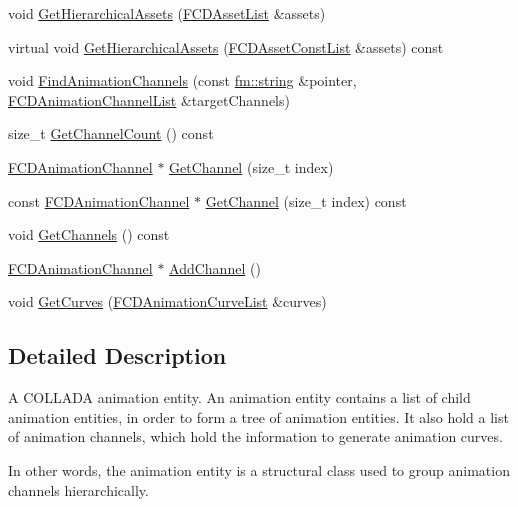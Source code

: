 \begin{DoxyCompactItemize}
\item 
void \hyperlink{classFCDAnimation_ab1598e18c09d09536a7e1b173c379927}{GetHierarchicalAssets} (\hyperlink{classfm_1_1pvector}{FCDAssetList} \&assets)
\item 
virtual void \hyperlink{classFCDAnimation_add68466cc91957fc0b0fe0961cb3948e}{GetHierarchicalAssets} (\hyperlink{classfm_1_1pvector}{FCDAssetConstList} \&assets) const 
\item 
void \hyperlink{classFCDAnimation_ae86237e164a1d535dc6f6a93412fd9d9}{FindAnimationChannels} (const \hyperlink{classfm_1_1stringT}{fm::string} \&pointer, \hyperlink{classfm_1_1pvector}{FCDAnimationChannelList} \&targetChannels)
\item 
size\_\-t \hyperlink{classFCDAnimation_ace899d6bc499d07fb65bcdd2c5a7fd3c}{GetChannelCount} () const 
\item 
\hyperlink{classFCDAnimationChannel}{FCDAnimationChannel} $\ast$ \hyperlink{classFCDAnimation_a09826937c16c3c73bdc9995aa751279c}{GetChannel} (size\_\-t index)
\item 
const \hyperlink{classFCDAnimationChannel}{FCDAnimationChannel} $\ast$ \hyperlink{classFCDAnimation_ac406240a1265a474bef985478d925286}{GetChannel} (size\_\-t index) const 
\item 
void \hyperlink{classFCDAnimation_a0fd3e11834d0ceb9fdd13ac8796976b9}{GetChannels} () const 
\item 
\hyperlink{classFCDAnimationChannel}{FCDAnimationChannel} $\ast$ \hyperlink{classFCDAnimation_a4ad6d5f5fb7b3c043af8fab2b4db766c}{AddChannel} ()
\item 
void \hyperlink{classFCDAnimation_a6018679c8025b3c67e7cddccdb437fc5}{GetCurves} (\hyperlink{classfm_1_1pvector}{FCDAnimationCurveList} \&curves)
\end{DoxyCompactItemize}


\subsection{Detailed Description}
A COLLADA animation entity. An animation entity contains a list of child animation entities, in order to form a tree of animation entities. It also hold a list of animation channels, which hold the information to generate animation curves.

In other words, the animation entity is a structural class used to group animation channels hierarchically. 

